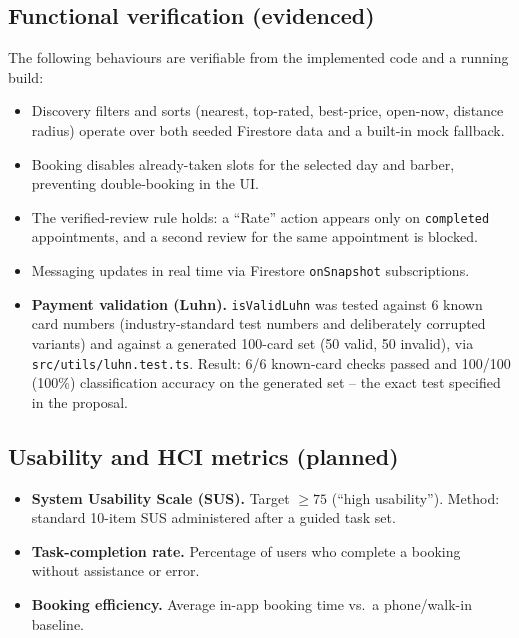 \documentclass[14pt]{article}
\begin{document}
\subsection{Functional verification (evidenced)}
The following behaviours are verifiable from the implemented code and a
running build:
\begin{itemize}
  \item Discovery filters and sorts (nearest, top-rated, best-price,
        open-now, distance radius) operate over both seeded Firestore
        data and a built-in mock fallback.
  \item Booking disables already-taken slots for the selected day and
        barber, preventing double-booking in the UI.
  \item The verified-review rule holds: a ``Rate'' action appears only on
        \texttt{completed} appointments, and a second review for the same
        appointment is blocked.
  \item Messaging updates in real time via Firestore
        \texttt{onSnapshot} subscriptions.
  \item \textbf{Payment validation (Luhn).} \texttt{isValidLuhn} was
        tested against 6 known card numbers (industry-standard test
        numbers and deliberately corrupted variants) and against a
        generated 100-card set (50 valid, 50 invalid), via
        \texttt{src/utils/luhn.test.ts}. Result: 6/6 known-card checks
        passed and 100/100 (100\%) classification accuracy on the
        generated set -- the exact test specified in the proposal.
\end{itemize}

\subsection{Usability and HCI metrics (planned)}
\begin{itemize}
  \item \textbf{System Usability Scale (SUS).} Target $\geq 75$ (``high
        usability''). Method: standard 10-item SUS administered after a
        guided task set.
  \item \textbf{Task-completion rate.} Percentage of users who complete a
        booking without assistance or error.
  \item \textbf{Booking efficiency.} Average in-app booking time vs.\ a
        phone/walk-in baseline.
\end{itemize}
\end{document}

